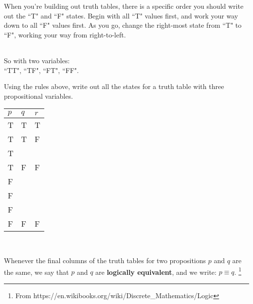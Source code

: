 {    \newpage
    \begin{introNOHEAD}{}
        When you're building out truth tables, there is a specific order
        you should write out the ``T" and ``F" states.
        Begin with all ``T" values first, and work your way down to
        all ``F" values first. As you go, change the right-most state
        from ``T" to ``F", working your way from right-to-left.

        ~\\
        So with two variables: \\ ``TT", ``TF", ``FT", ``FF".
    \end{introNOHEAD}
    
    \begin{questionNOGRADE}{\thequestion}
        Using the rules above, write out all the states for a
        truth table with three propositional variables. ~\\
        
        \begin{center}
            \begin{tabular}{ | p{2cm} | p{2cm} | p{2cm} | }
                \hline
                $p$ & $q$ & $r$   \\ \hline
                T & T & T         \\ \hline
                T & T & F         \\ \hline
                T &  &          \\ \hline
                T & F & F         \\ \hline
                F &  &          \\ \hline
                F &  &          \\ \hline
                F &  &          \\ \hline
                F & F & F         \\ \hline
            \end{tabular}
        \end{center}
    \end{questionNOGRADE}

    ~\\
        
    \newpage

    \begin{introNOHEAD}{}
        Whenever the final columns of the truth tables for two propositions $p$ and $q$ are the same,
        we say that $p$ and $q$ are \textbf{logically equivalent}, and we write: $p \equiv q$.
        \footnote{From https://en.wikibooks.org/wiki/Discrete\_Mathematics/Logic}
    \end{introNOHEAD}




}
